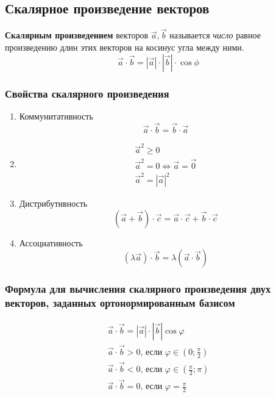 \subsection{Скалярное произведение векторов}

\begin{definition}
  \textbf{Скалярным произведением} векторов $\vec{a}, \vec{b}$ называется \textit{число}  равное произведению длин этих векторов на косинус угла между ними.\[
  \vec{a} \cdot \vec{b} = |\vec{a}| \cdot |\vec{b}| \cdot \cos \phi
  \] 
\end{definition}

\subsubsection{Свойства скалярного произведения}

\begin{enumerate}
  \item Коммунитативность \[
    \vec{a} \cdot \vec{b} = \vec{b} \cdot \vec{a}
  \] 
  \item
  \begin{gather*}
    \vec{a}^2 \ge 0 \\
    \vec{a}^2 = 0 \iff \vec{a} = \vec{0} \\
    \vec{a}^2 = |\vec{a}|^2
  \end{gather*}
  \item Дистрибутивность \[
      \left( \vec{a} + \vec{b} \right) \cdot \vec{c} = \vec{a} \cdot \vec{c} + \vec{b} \cdot \vec{c}
  \]
  \item Ассоциативность \[
    \left( \lambda \vec{a} \right) \cdot \vec{b} = \lambda \left( \vec{a} \cdot \vec{b} \right) 
  \]
\end{enumerate}

\subsubsection{Формула для вычисления скалярного произведения двух векторов, заданных ортонормированным базисом}

\begin{gather*}
  \vec{a} \cdot \vec{b} = |\vec{a}| \cdot |\vec{b}| \cos \varphi \\
  \vec{a} \cdot \vec{b} > 0 \text{, если } \varphi \in \left( 0; \frac{\pi}{2} \right)  \\
  \vec{a} \cdot \vec{b} < 0 \text{, если } \varphi \in \left( \frac{\pi}{2}; \pi \right) \\
  \vec{a} \cdot \vec{b} = 0 \text{, если } \varphi = \frac{\pi}{2}
\end{gather*}

